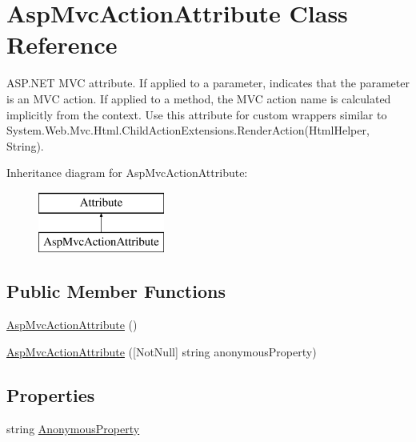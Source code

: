 \hypertarget{class_asp_mvc_action_attribute}{}\section{Asp\+Mvc\+Action\+Attribute Class Reference}
\label{class_asp_mvc_action_attribute}


A\+S\+P.\+N\+ET M\+VC attribute. If applied to a parameter, indicates that the parameter is an M\+VC action. If applied to a method, the M\+VC action name is calculated implicitly from the context. Use this attribute for custom wrappers similar to {\ttfamily System.\+Web.\+Mvc.\+Html.\+Child\+Action\+Extensions.\+Render\+Action(\+Html\+Helper, String)}.  


Inheritance diagram for Asp\+Mvc\+Action\+Attribute\+:\begin{figure}[H]
\begin{center}
\leavevmode
\includegraphics[height=2.000000cm]{class_asp_mvc_action_attribute}
\end{center}
\end{figure}
\subsection*{Public Member Functions}
\begin{DoxyCompactItemize}
\item 
\mbox{\hyperlink{class_asp_mvc_action_attribute_a252bc1d3d3db3cae55317ccccbfb0923}{Asp\+Mvc\+Action\+Attribute}} ()
\item 
\mbox{\hyperlink{class_asp_mvc_action_attribute_af335bf9a97d8ae88f73337f3e7b70045}{Asp\+Mvc\+Action\+Attribute}} (\mbox{[}Not\+Null\mbox{]} string anonymous\+Property)
\end{DoxyCompactItemize}
\subsection*{Properties}
\begin{DoxyCompactItemize}
\item 
string \mbox{\hyperlink{class_asp_mvc_action_attribute_a7068fa64becd1bc3de4622e5a50b0a49}{Anonymous\+Property}}
\end{DoxyCompactItemize}


